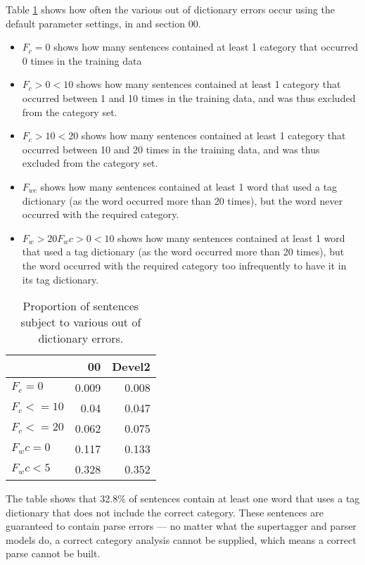 Table \ref{analysis:ood} shows how often the various out of dictionary errors occur using the default \candc parameter settings, in \develtwo and section 00.

\begin{itemize}
\item $F_c=0$ shows how many sentences contained at least 1 category that occurred 0 times in the training data
\item $F_c>0<10$ shows how many sentences contained at least 1 category that occurred between 1 and 10 times in the training data, and was thus excluded from the category set.
\item $F_c>10<20$ shows how many sentences contained at least 1 category that occurred between 10 and 20 times in the training data, and was thus excluded from the category set.
\item $F_{wc}$ shows how many sentences contained at least 1 word that used a tag dictionary (as the word occurred more than 20 times), but the word never occurred with the required category.
\item $F_w>20 F_wc>0<10$ shows how many sentences contained at least 1 word that used a tag dictionary (as the word occurred more than 20 times), but the word occurred with the required category too infrequently to have it in its tag dictionary.
\end{itemize}
\begin{table}
\begin{tabular}{l|r|r}
 & 00 & Devel2\\ \hline
$F_c = 0$ & 0.009 & 0.008\\
$F_c <= 10$ & 0.04 & 0.047\\
$F_c <= 20$ & 0.062 & 0.075\\
$F_wc = 0$ & 0.117 & 0.133\\
$F_wc < 5$ & 0.328 & 0.352\\
\end{tabular}\caption{Proportion of sentences subject to various out of dictionary errors.}\label{analysis:ood}
\end{table}




The table shows that 32.8\% of sentences contain at least one word that uses a tag dictionary that does not include the correct category. These sentences are guaranteed to contain parse errors --- no matter what the supertagger and parser models do, a correct category analysis cannot be supplied, which means a correct parse cannot be built.

